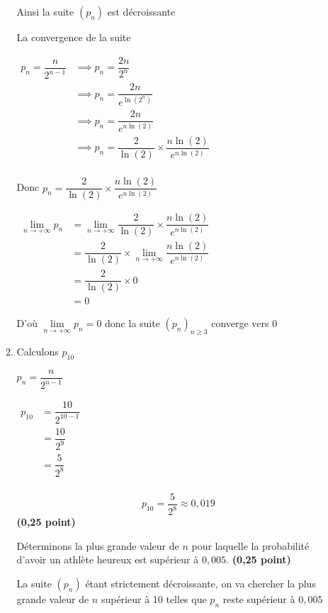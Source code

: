 \documentclass[12pt,a4paper]{article}
\begin{document}
\begin{enumerate}
\begin{enumerate}
Ainsi la suite $(p_n)$ est décroissante

La convergence de la suite 

\(
\begin{aligned} 
p_n = \dfrac{n}{2^{n-1}} &\implies p_n = \dfrac{2n}{2^{n}}\\
												 &\implies p_n = \dfrac{2n}{e^{\ln(2^{n})}}\\
												 &\implies p_n = \dfrac{2n}{e^{n\ln(2)}}\\
												 &\implies p_n = \dfrac{2}{\ln(2)}\times\dfrac{n\ln(2)}{e^{n\ln(2)}}\\
\end{aligned}
\)

Donc \( p_n = \dfrac{2}{\ln(2)}\times\dfrac{n\ln(2)}{e^{n\ln(2)}} \)

 \(
 \begin{aligned} 
  \lim\limits_{n \to +\infty} p_n &= \lim\limits_{n \to +\infty} \dfrac{2}{\ln(2)}\times\dfrac{n\ln(2)}{e^{n\ln(2)}} \\
  																&=\dfrac{2}{\ln(2)}\times  \lim\limits_{n \to +\infty} \dfrac{n\ln(2)}{e^{n\ln(2)}}\\
  																&=\dfrac{2}{\ln(2)}\times  0\\
  																&=0
  \end{aligned}
 \)
 
 D'où \( \lim\limits_{n \to +\infty} p_n =0 \) donc la suite \( (p_n)_{n \geq 3} \) converge vers \( 0 \)

        \item Calculons \( p_{10} \)
        
        \( p_n = \dfrac{n}{2^{n-1}} \)
        
        \(
        \begin{aligned} 
        	p_{10} &= \dfrac{10}{2^{10-1}}\\
        				 &= \dfrac{10}{2^{9}}\\
        				 &= \dfrac{5}{2^{8}}\\
        \end{aligned}
        \)

				\[ \boxed{p_{10} = \dfrac{5}{2^{8}} \approx 0,019}  \] \hfill \textbf{ (0,25 point) }    
        
        Déterminons la plus grande valeur de \( n \) pour laquelle la probabilité d’avoir un athlète heureux est supérieur à \( 0,005 \). \hfill \textbf{ (0,25 point) }

La suite $(p_{n})$ étant strictement décroissante, on va chercher la plus grande valeur de $n$ supérieur à 10
telles que $p_{n}$ reste supérieur à $0,005$      


\end{enumerate}
\end{enumerate}
\end{document}
